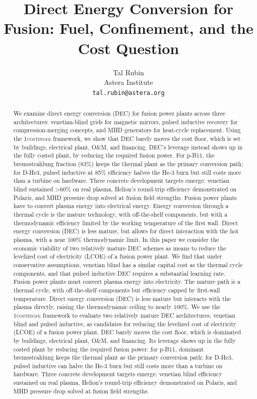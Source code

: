 \documentclass{article}
\title{Direct Energy Conversion for Fusion: Fuel, Confinement, and the Cost Question}
\author{
  Tal Rubin \\
  Astera Institute \\
  \texttt{tal.rubin@astera.org}
}
\begin{document}
\maketitle

\begin{abstract}
We examine direct energy conversion (DEC) for fusion power plants across three architectures: venetian-blind grids for magnetic mirrors, pulsed inductive recovery for compression-merging concepts, and MHD generators for heat-cycle replacement. Using the \textsc{1costingfe} framework, we show that DEC barely moves the cost floor, which is set by buildings, electrical plant, O\&M, and financing. DEC's leverage instead shows up in the fully costed plant, by reducing the required fusion power. For p-B11, the bremsstrahlung fraction (83\%) keeps the thermal plant as the primary conversion path; for D-He3, pulsed inductive at 85\% efficiency halves the He-3 burn but still costs more than a turbine on hardware. Three concrete development targets emerge: venetian blind sustained \textgreater60\% on real plasma, Helion's round-trip efficiency demonstrated on Polaris, and MHD pressure drop solved at fusion field strengths.
%
%
Fusion power plants have to convert plasma energy into electrical energy. Energy conversion through a thermal cycle is the mature technology, with off-the-shelf components, but with a thermodynamic efficiency limited by the working temperature of the first wall. Direct energy conversion (DEC) is less mature, but allows for direct interaction with the hot plasma, with a near 100\% thermodynamic limit. In this paper we consider the economic viability of two relatively mature DEC schemes as means to reduce the levelized cost of electricity (LCOE) of a fusion power plant. We find that under conservative assumptions, venetian blind has a similar capital cost as the thermal cycle components, and that pulsed inductive DEC requires a substantial learning rate.
%
%
Fusion power plants must convert plasma energy into electricity. The mature path is a thermal cycle, with off-the-shelf components but efficiency capped by first-wall temperature. Direct energy conversion (DEC) is less mature but interacts with the plasma directly, raising the thermodynamic ceiling to nearly 100\%. We use the \textsc{1costingfe} framework to evaluate two relatively mature DEC architectures, venetian blind and pulsed inductive, as candidates for reducing the levelized cost of electricity (LCOE) of a fusion power plant. DEC barely moves the cost floor, which is dominated by buildings, electrical plant, O\&M, and financing. Its leverage shows up in the fully costed plant by reducing the required fusion power: for p-B11, dominant bremsstrahlung keeps the thermal plant as the primary conversion path; for D-He3, pulsed inductive can halve the He-3 burn but still costs more than a turbine on hardware. Three concrete development targets emerge: venetian blind efficiency sustained on real plasma, Helion's round-trip efficiency demonstrated on Polaris, and MHD pressure drop solved at fusion field strengths.
\end{abstract}
\end{document}
